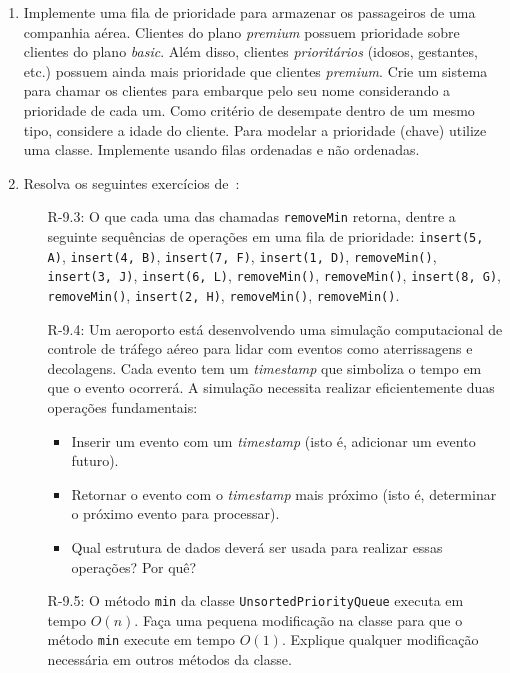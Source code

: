 \begin{enumerate}
	\item Implemente uma fila de prioridade para armazenar os passageiros de uma companhia aérea. Clientes do plano \textit{premium} possuem prioridade sobre clientes do plano \textit{basic}. Além disso, clientes \textit{prioritários} (idosos, gestantes, etc.) possuem ainda mais prioridade que clientes \textit{premium}. Crie um sistema para chamar os clientes para embarque pelo seu nome considerando a prioridade de cada um. Como critério de desempate dentro de um mesmo tipo, considere a idade do cliente.	Para modelar a prioridade (chave) utilize uma classe. Implemente usando filas ordenadas e não ordenadas.
	
	\bigskip
	
	\item Resolva os seguintes exercícios de~\cite{GoodrichEtAl2014}:
	\begin{itemize}
		\item[R-9.3:] O que cada uma das chamadas \texttt{removeMin} retorna, dentre a seguinte sequências de operações em uma fila de prioridade: \texttt{insert(5,\,A)}, \texttt{insert(4,\,B)}, \texttt{insert(7,\,F)}, \texttt{insert(1,\,D)}, \texttt{removeMin()}, \texttt{insert(3,\,J)}, \texttt{insert(6,\,L)}, \texttt{removeMin()}, \texttt{removeMin()}, \texttt{insert(8,\,G)}, \texttt{removeMin()}, \texttt{insert(2,\,H)}, \texttt{removeMin()}, \texttt{removeMin()}.
		
		\item[R-9.4:] Um aeroporto está desenvolvendo uma simulação computacional de controle de tráfego aéreo para lidar com eventos como aterrissagens e decolagens. Cada evento tem um \textit{timestamp} que simboliza o tempo em que o evento ocorrerá. A simulação necessita realizar eficientemente duas operações fundamentais:
		\begin{itemize}
			\item Inserir um evento com um \textit{timestamp} (isto é, adicionar um evento futuro).
			\item Retornar o evento com o \textit{timestamp} mais próximo (isto é, determinar o próximo evento para processar).
			\item Qual estrutura de dados deverá ser usada para realizar essas operações? Por quê?
		\end{itemize}
		
		\item[R-9.5:] O método \texttt{min} da classe \texttt{UnsortedPriorityQueue} executa em tempo $O(n)$. Faça uma pequena modificação na classe para que o método \texttt{min} execute em tempo $O(1)$. Explique qualquer modificação necessária em outros métodos da classe.
		

\end{itemize}
\end{enumerate}
